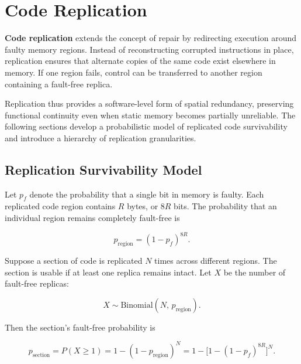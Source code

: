 \chapter{Code Replication}
\label{chap:code-replication}

\textbf{Code replication} extends the concept of repair by redirecting execution
around faulty memory regions. Instead of reconstructing corrupted instructions
in place, replication ensures that alternate copies of the same code exist
elsewhere in memory. If one region fails, control can be transferred to another
region containing a fault-free replica.

Replication thus provides a software-level form of spatial redundancy,
preserving functional continuity even when static memory becomes partially
unreliable. The following sections develop a probabilistic model of replicated
code survivability and introduce a hierarchy of replication granularities.

\section{Replication Survivability Model}
\label{sec:replication-model}

Let $p_f$ denote the probability that a single bit in memory is faulty.
Each replicated code region contains $R$ bytes, or $8R$ bits.
The probability that an individual region remains completely fault-free is

\begin{equation}
p_{\text{region}} = (1 - p_f)^{8R}.
\end{equation}

Suppose a section of code is replicated $N$ times across different regions.
The section is usable if at least one replica remains intact.
Let $X$ be the number of fault-free replicas:

\begin{equation}
X \sim \mathrm{Binomial}(N,\, p_{\text{region}}).
\end{equation}

Then the section’s fault-free probability is

\begin{equation}
p_{\text{section}} = P(X \ge 1)
  = 1 - (1 - p_{\text{region}})^{N}
  = 1 - \Big[1 - (1 - p_f)^{8R}\Big]^{N}.
\end{equation}

